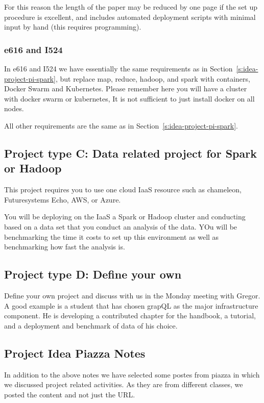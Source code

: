 For this reason the length of the paper may be reduced by one page if
the set up procedure is excellent, and includes automated deployment
scripts with minimal input by hand (this requires programming).


\subsubsection{e616 and I524}

In e616 and I524 we have essentially the same requirements as in
Section~\ref{s:idea-project-pi-spark}, but
replace map, reduce, hadoop, and spark with containers, Docker Swarm
and Kubernetes. Please remember here you will have a cluster with
docker swarm or kubernetes, It is not sufficient to just install
docker on all nodes.

All other requirements are the same as in Section~\ref{s:idea-project-pi-spark}. 



\subsection{Project type C: Data related project for Spark or Hadoop}

This project requires you to use one cloud IaaS resource such as
chameleon, Futuresystems Echo, AWS, or Azure.

You will be deploying on the IaaS a Spark or Hadoop cluster and
conducting based on a data set that you conduct an analysis of the
data. YOu will be benchmarking the time it costs to set up this
environment as well as benchmarking how fast the analysis is. 


\subsection{Project type D: Define your own}

Define your own project and discuss with us in the Monday meeting with
Gregor. 
A good example is a student that has chosen grapQL as the major
infrastructure component. He is developing a contributed chapter for
the handbook, a tutorial, and a deployment and benchmark of data of
his choice.


\subsection{Project Idea Piazza Notes}

In addition to the above notes we have selected some postes from
piazza in which we discussed project related activities. As they are
from different classes, we posted the content and not just the URL.


